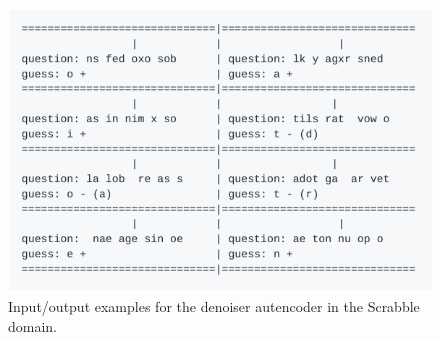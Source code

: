 \begin{figure}
  \includegraphics[width=0.6\linewidth]{img/scrabble_denoiser_examples}
  \caption{Input/output examples for the denoiser autencoder in the Scrabble domain.}
  \label{fig:scrabble_denoiser_examples}
\end{figure}

